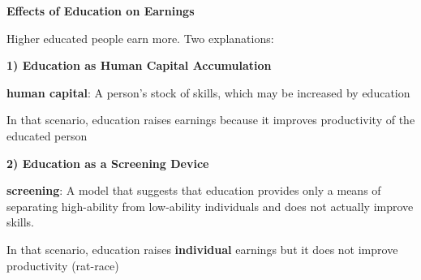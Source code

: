 \documentclass[landscape]{slides}
\begin{document}
%
%
%


%
%
%


\begin{slide}
\begin{center}
{\bf Effects of Education on Earnings}%
\end{center}
Higher educated people earn more. Two explanations:

{\bf 1) Education as Human Capital Accumulation}

{\bf human capital}:
A person's stock of skills, which may be increased by education

In that scenario, education raises earnings because it improves productivity
of the educated person

{\bf 2) Education as a Screening Device}

{\bf screening}:
A model that suggests that education provides only a means of separating high-ability from low-ability individuals and does not actually improve skills.

In that scenario, education raises \textbf{individual} earnings but it does not improve productivity (rat-race)
\end{slide}
\end{document}

